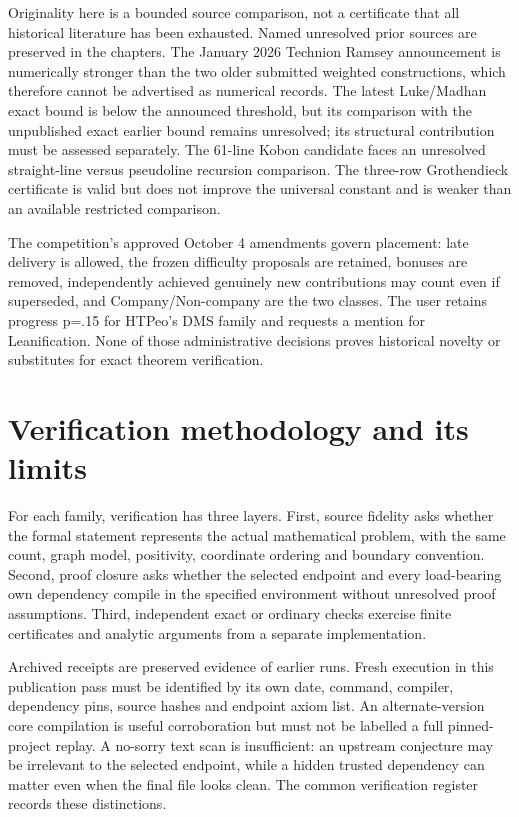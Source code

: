 \documentclass[11pt,a4paper]{article}
\begin{document}
Originality here is a bounded source comparison, not a certificate that all historical literature has been exhausted. Named unresolved prior sources are preserved in the chapters. The January 2026 Technion Ramsey announcement is numerically stronger than the two older submitted weighted constructions, which therefore cannot be advertised as numerical records. The latest Luke/Madhan exact bound is below the announced threshold, but its comparison with the unpublished exact earlier bound remains unresolved; its structural contribution must be assessed separately. The 61-line Kobon candidate faces an unresolved straight-line versus pseudoline recursion comparison. The three-row Grothendieck certificate is valid but does not improve the universal constant and is weaker than an available restricted comparison.

The competition's approved October 4 amendments govern placement: late delivery is allowed, the frozen difficulty proposals are retained, bonuses are removed, independently achieved genuinely new contributions may count even if superseded, and Company/Non-company are the two classes. The user retains progress p=.15 for HTPeo's DMS family and requests a mention for Leanification. None of those administrative decisions proves historical novelty or substitutes for exact theorem verification.

\section{Verification methodology and its limits}
For each family, verification has three layers. First, source fidelity asks whether the formal statement represents the actual mathematical problem, with the same count, graph model, positivity, coordinate ordering and boundary convention. Second, proof closure asks whether the selected endpoint and every load-bearing own dependency compile in the specified environment without unresolved proof assumptions. Third, independent exact or ordinary checks exercise finite certificates and analytic arguments from a separate implementation.

Archived receipts are preserved evidence of earlier runs. Fresh execution in this publication pass must be identified by its own date, command, compiler, dependency pins, source hashes and endpoint axiom list. An alternate-version core compilation is useful corroboration but must not be labelled a full pinned-project replay. A no-sorry text scan is insufficient: an upstream conjecture may be irrelevant to the selected endpoint, while a hidden trusted dependency can matter even when the final file looks clean. The common verification register records these distinctions.
\end{document}
